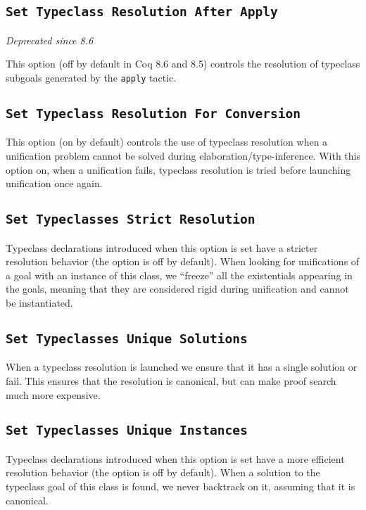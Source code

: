 \subsection{\tt Set Typeclass Resolution After Apply}
\emph{Deprecated since 8.6}

This option (off by default in Coq 8.6 and 8.5) controls the resolution
of typeclass subgoals generated by the {\tt apply} tactic.

\subsection{\tt Set Typeclass Resolution For Conversion}

This option (on by default) controls the use of typeclass resolution
when a unification problem cannot be solved during
elaboration/type-inference. With this option on, when a unification
fails, typeclass resolution is tried before launching unification once again.

\subsection{\tt Set Typeclasses Strict Resolution}

Typeclass declarations introduced when this option is set have a
stricter resolution behavior (the option is off by default). When
looking for unifications of a goal with an instance of this class, we
``freeze'' all the existentials appearing in the goals, meaning that
they are considered rigid during unification and cannot be instantiated.

\subsection{\tt Set Typeclasses Unique Solutions}

When a typeclass resolution is launched we ensure that it has a single
solution or fail. This ensures that the resolution is canonical, but can
make proof search much more expensive.

\subsection{\tt Set Typeclasses Unique Instances}

Typeclass declarations introduced when this option is set have a
more efficient resolution behavior (the option is off by default). When
a solution to the typeclass goal of this class is found, we never
backtrack on it, assuming that it is canonical.

